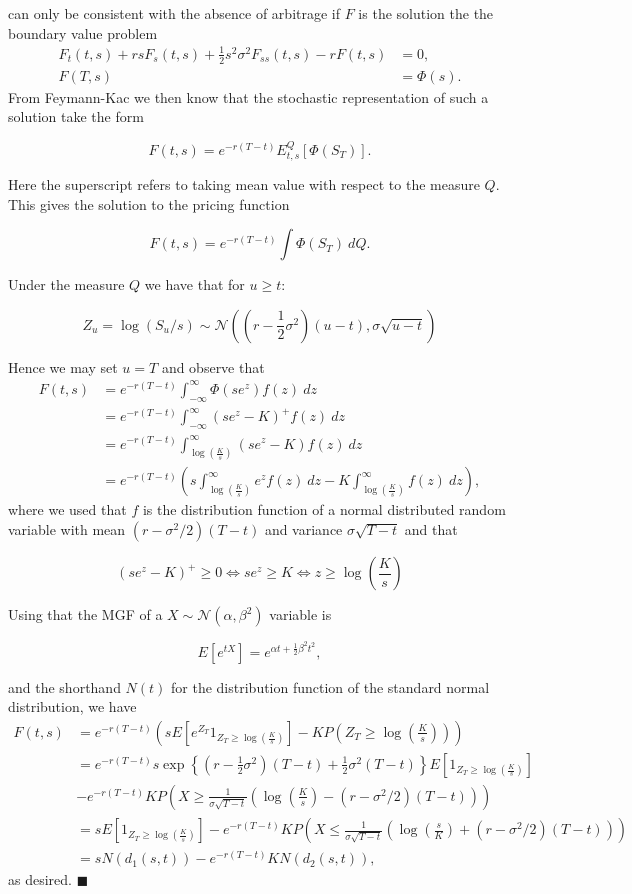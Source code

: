 \documentclass[a4paper,10pt,openany]{book}
\begin{document}
can only be consistent with the absence of arbitrage if \(F\) is the solution the the boundary value problem
\begin{align*}
F_t(t,s)+rsF_s(t,s)+\frac{1}{2}s^2\sigma^2F_{ss}(t,s)-rF(t,s)&=0,\\
F(T,s)&=\Phi(s).
\end{align*}
From Feymann-Kac we then know that the stochastic representation of such a solution take the form

\[
F(t,s)=e^{-r(T-t)}E_{t,s}^Q[\Phi(S_T)].
\]

Here the superscript refers to taking mean value with respect to the measure \(Q\). This gives the solution to the pricing function

\[
F(t,s)=e^{-r(T-t)}\int \Phi(S_T)\ dQ.
\]

Under the measure \(Q\) we have that for \(u\ge t\):

\[
Z_u=\log (S_u/s)\sim \mathcal{N}\left(\left(r-\frac{1}{2}\sigma^2\right)(u-t),\sigma\sqrt{u-t}\right)
\]

Hence we may set \(u=T\) and observe that
\begin{align*}
F(t,s)&=e^{-r(T-t)}\int_{-\infty}^\infty \Phi(se^z) f(z)\ dz\\
&=e^{-r(T-t)}\int_{-\infty}^\infty (se^z-K)^+ f(z)\ dz\\
&=e^{-r(T-t)}\int_{\log\left(\frac{K}{s}\right)}^{\infty} (se^z-K) f(z)\ dz\\
&=e^{-r(T-t)}\left(s\int_{\log\left(\frac{K}{s}\right)}^{\infty} e^z f(z)\ dz-K\int_{\log\left(\frac{K}{s}\right)}^{\infty} f(z)\ dz\right),
\end{align*}
where we used that \(f\) is the distribution function of a normal distributed random variable with mean \((r-\sigma^2/2)(T-t)\) and variance \(\sigma\sqrt{T-t}\) and that

\[
(se^z-K)^+ \ge 0\iff se^z\ge K\iff z\ge \log\left(\frac{K}{s}\right)
\]

Using that the MGF of a \(X\sim\mathcal{N}(\alpha, \beta^2)\) variable is

\[
E[e^{tX}]=e^{\alpha t+\frac{1}{2}\beta ^2t^2},
\]

and the shorthand \(N(t)\) for the distribution function of the standard normal distribution, we have
\begin{align*}
F(t,s)&=e^{-r(T-t)}\left(sE\left[e^{Z_T}1_{Z_T\ge \log\left(\frac{K}{s}\right)}\right]-K P\left(Z_T\ge \log\left(\frac{K}{s}\right)\right)\right)\\
&=e^{-r(T-t)}s\exp\left\{\left(r-\frac{1}{2}\sigma^2\right)(T-t)+\frac{1}{2}\sigma^2(T-t)\right\}E\left[1_{Z_T\ge \log\left(\frac{K}{s}\right)}\right]\\
&-e^{-r(T-t)}K P\left(X\ge\frac{1}{\sigma\sqrt{T-t}}\left( \log\left(\frac{K}{s}\right)-(r-\sigma^2/2)(T-t)\right)\right)\\
&=sE\left[1_{Z_T\ge \log\left(\frac{K}{s}\right)}\right]-e^{-r(T-t)}K P\left(X\le\frac{1}{\sigma\sqrt{T-t}}\left(\log\left(\frac{s}{K}\right)+(r-\sigma^2/2)(T-t)\right)\right)\\
&=sN(d_1(s,t))-e^{-r(T-t)}K N\left(d_2(s,t)\right),
\end{align*}
as desired. \(\blacksquare\)
\end{document}
